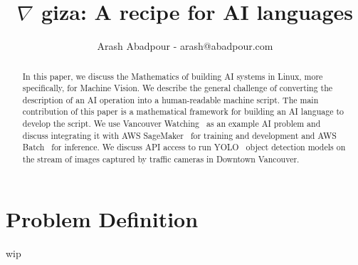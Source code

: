 \documentclass{article}
\title{$\nabla$ giza: A recipe for AI languages}
\author{Arash Abadpour - arash@abadpour.com}
\begin{document}
\maketitle

\begin{abstract}
In this paper, we discuss the Mathematics of building AI systems in Linux, more specifically, for Machine Vision. We describe the general challenge of converting the description of an AI operation into a human-readable machine script. The main contribution of this paper is a mathematical framework for building an AI language to develop the script. We use Vancouver Watching~\cite{vanwatch} as an example AI problem and discuss integrating it with AWS SageMaker~\cite{aws_sage_maker} for training and development and AWS Batch~\cite{aws_batch} for inference. We discuss API access to run YOLO~\cite{YOLO} object detection models on the stream of images captured by traffic cameras in Downtown Vancouver. 
\end{abstract}

\section{Problem Definition}

wip



\end{document}
